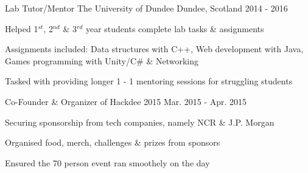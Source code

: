 \begin{cventries}
  \cventry
    {Lab Tutor/Mentor} %
    {The University of Dundee} %
    {Dundee, Scotland} %
    {2014 - 2016} %
    {
      \begin{cvitems} %
        \item {Helped 1$^{st}$, 2$^{nd}$ \& 3$^{rd}$ year students complete lab tasks \& assignments}
        \item {Assignments included: Data structures with C++, Web development with Java, Games programming with Unity/C\# \& Networking}
        \item {Tasked with providing longer 1 - 1 mentoring sessions for struggling students}
      \end{cvitems}
    }

  \cventry
    {Co-Founder \& Organizer of Hackdee 2015} %
    {} %
    {} %
    {Mar. 2015 - Apr. 2015} %
    {
      \begin{cvitems} %
        \item {Securing sponsorship from tech companies, namely NCR \& J.P. Morgan}
        \item {Organised food, merch, challenges \& prizes from sponsors}
        \item {Ensured the 70 person event ran smoothely on the day}
      \end{cvitems}
    }





\end{cventries}
